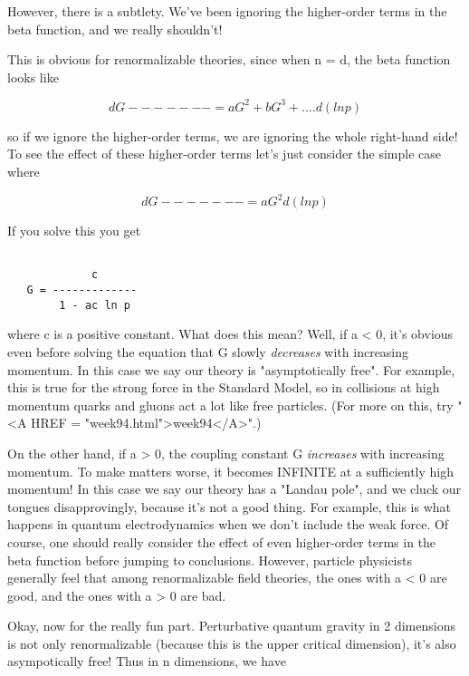 However, there is a subtlety.  We've been ignoring the higher-order
terms in the beta function, and we really shouldn't!

This is obvious for renormalizable theories, since when n = d, the 
beta function looks like


$$

   dG 
 -------  = aG^{2} + bG^{3} + ....
 d(ln p)
$$
    
so if we ignore the higher-order terms, we are ignoring the whole 
right-hand side!  To see the effect of these higher-order terms let's 
just consider the simple case where


$$

   dG 
 -------  = aG^{2}
 d(ln p)
$$
    
If you solve this you get


\begin{verbatim}

             c 
   G = -------------
        1 - ac ln p 
\end{verbatim}
    
where c is a positive constant.   What does this mean?  Well, if a < 0, 
it's obvious even before solving the equation that G slowly \emph{decreases} 
with increasing momentum.  In this case we say our theory is 
"asymptotically free".   For example, this is true for the strong 
force in the Standard Model, so in collisions at high momentum quarks 
and gluons act a lot like free particles.  (For more on this, try "<A HREF = "week94.html">week94</A>".)

On the other hand, if a > 0, the coupling constant G
\emph{increases} with increasing momentum.  To make matters worse, it
becomes INFINITE at a sufficiently high momentum!  In this case we say
our theory has a "Landau pole", and we cluck our tongues
disapprovingly, because it's not a good thing.  For example, this is
what happens in quantum electrodynamics when we don't include the weak
force.  Of course, one should really consider the effect of even
higher-order terms in the beta function before jumping to conclusions.
However, particle physicists generally feel that among renormalizable
field theories, the ones with a < 0 are good, and the ones with a
> 0 are bad.

Okay, now for the really fun part.  Perturbative quantum gravity
in 2 dimensions is not only renormalizable (because this is the 
upper critical dimension), it's also asympotically free!  Thus
in n dimensions, we have


$$

